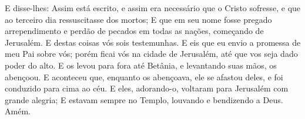 {  E disse-lhes: Assim está escrito, e assim era necessário que o Cristo sofresse, e que ao terceiro dia ressuscitasse dos mortos;
  E que em seu nome fosse pregado arrependimento e perdão de pecados em todas as nações, começando de Jerusalém.
  E destas coisas vós sois testemunhas.
  E eis que eu envio a promessa de meu Pai sobre vós; porém ficai vós na cidade de Jerusalém, até que vos seja dado poder do alto.
  E os levou para fora até Betânia, e levantando suas mãos, os abençoou.
  E aconteceu que, enquanto os abençoava, ele se afastou deles, e foi conduzido para cima ao céu.
  E eles, adorando-o, voltaram para Jerusalém com grande alegria;
  E estavam sempre no Templo, louvando e bendizendo a Deus. Amém.\par }

